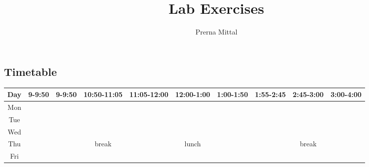 \documentclass[a4paper,12pt]{article}
\begin{document}
\title{Lab Exercises}
\author{Prerna Mittal}
\maketitle
{}
\tableofcontents
\newpage
\begin{landscape}
\section{Timetable}
\begin{tabular}{|c|c|c|c|c|c|c|c|c|c|}
    \hline
    Day&9-9:50&9-9:50&10:50-11:05&11:05-12:00&12:00-1:00&1:00-1:50&1:55-2:45&2:45-3:00&3:00-4:00\\
    \hline
    Mon&&&&&&&&&\\
    \cline{1-3}
    \cline{5-5}
    \cline{7-8}
    \cline{10-10}
    Tue&&&&&&&&&\\
    \cline{1-3}
    \cline{5-5}
    \cline{7-8}
    \cline{10-10}
    Wed&&&&&&&&&\\
    \cline{1-3}
    \cline{5-5}
    \cline{7-8}
    \cline{10-10}
    Thu&&&break&&lunch&&&break&\\
    \cline{1-3}
    \cline{5-5}
    \cline{7-8}
    \cline{10-10}
    Fri&&&&&&&&&\\
    \cline{1-3}
    \cline{5-5}
    \cline{7-8}
    \cline{10-10}
    \hline
\end{tabular}
\end{landscape}
\end{document}
